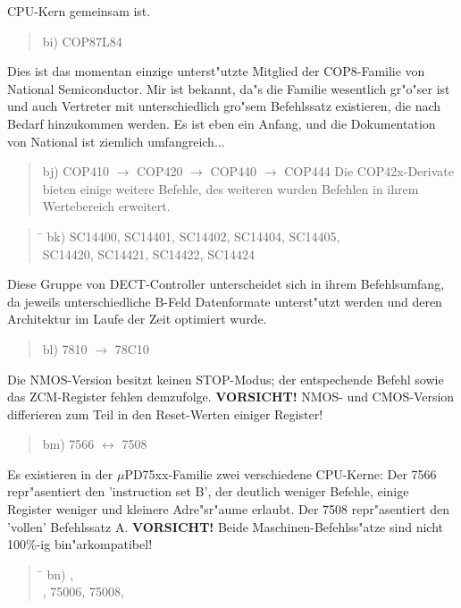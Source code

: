 \documentclass[12pt,a4paper,twoside]{report}
\newcommand{\bb}[1]{{\bf #1}}
\begin{document}
{CPU-Kern gemeinsam ist.
\begin{quote}
bi) COP87L84
\end{quote}
Dies ist das momentan einzige unterst"utzte Mitglied der COP8-Familie 
von National Semiconductor.  Mir ist bekannt, da"s die Familie 
wesentlich gr"o"ser ist und auch Vertreter mit unterschiedlich gro"sem 
Befehlssatz existieren, die nach Bedarf hinzukommen werden.  Es ist eben 
ein Anfang, und die Dokumentation von National ist ziemlich umfangreich...
\begin{quote}
bj) COP410 $\rightarrow$ COP420 $\rightarrow$ COP440 $\rightarrow$ COP444
Die COP42x-Derivate bieten einige weitere Befehle, des weiteren wurden
Befehlen in ihrem Wertebereich erweitert.
\end{quote}
\begin{quote}
\begin{tabbing}
\hspace{0.7cm} \= \kill
bk) \> SC14400, SC14401, SC14402, SC14404, SC14405, \\
    \> SC14420, SC14421, SC14422, SC14424 \\
\end{tabbing}
\end{quote}
Diese Gruppe von DECT-Controller unterscheidet sich in ihrem
Befehlsumfang, da jeweils unterschiedliche B-Feld Datenformate
unterst"utzt werden und deren Architektur im Laufe der Zeit optimiert
wurde.
\begin{quote}
bl) 7810 $\rightarrow$ 78C10
\end{quote}
Die NMOS-Version besitzt keinen STOP-Modus; der entspechende Befehl sowie
das ZCM-Register fehlen demzufolge.  \bb{VORSICHT!} NMOS- und CMOS-Version
differieren zum Teil in den Reset-Werten einiger Register!
\begin{quote}
bm) 7566 $\leftrightarrow$ 7508
\end{quote}
Es existieren in der $\mu$PD75xx-Familie zwei verschiedene
CPU-Kerne: Der 7566 repr"asentiert den 'instruction set B', der
deutlich weniger Befehle, einige Register weniger und kleinere
Adre"sr"aume erlaubt.  Der 7508 repr"asentiert den 'vollen'
Befehlssatz A.  {\bf VORSICHT!} Beide Maschinen-Befehlss"atze
sind nicht 100\%-ig bin"arkompatibel!
\begin{quote}
\begin{tabbing}
\hspace{0.7cm} \= \kill
bn) , \\
    , 75006, 75008, \\

\end{tabbing}
\end{quote}}
\end{document}
